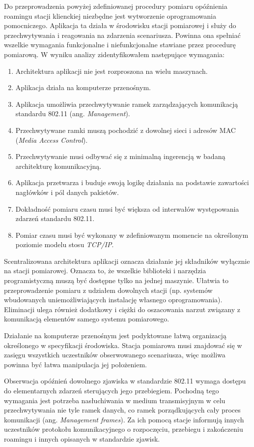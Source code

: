 Do przeprowadzenia powyżej zdefiniowanej procedury pomiaru opóźnienia roamingu stacji klienckiej niezbędne jest wytworzenie oprogramowania pomocniczego. Aplikacja ta działa w środowisku stacji pomiarowej i służy do przechwytywania i reagowania na zdarzenia scenariusza. Powinna ona spełniać wszelkie wymagania funkcjonalne i niefunkcjonalne stawiane przez procedurę pomiarową. W wyniku analizy zidentyfikowałem następujące wymagania: 
\begin{enumerate}
\item Architektura aplikacji nie jest rozproszona na wielu maszynach.
\item Aplikacja działa na komputerze przenośnym.
\item Aplikacja umożliwia przechwytywanie ramek zarządzających komunikacją standardu 802.11 (ang. \emph{Management}). 
\item Przechwytywane ramki muszą pochodzić z dowolnej sieci i adresów MAC (\emph{Media Access Control}).
\item Przechwytywanie musi odbywać się z minimalną ingerencją w badaną architekturę komunikacyjną.
\item Aplikacja przetwarza i buduje swoją logikę działania na podstawie zawartości nagłówków i pól danych pakietów. 
\item Dokładność pomiaru czasu musi być większa od interwałów występowania zdarzeń standardu 802.11.
\item Pomiar czasu musi być wykonany w zdefiniowanym momencie na określonym poziomie modelu stosu \emph{TCP/IP}.
\end{enumerate}

Scentralizowana architektura aplikacji oznacza działanie jej składników wyłącznie na stacji pomiarowej. Oznacza to, że wszelkie biblioteki i narzędzia programistyczną muszą być dostępne tylko na jednej maszynie. Ułatwia to przeprowadzenie pomiaru z udziałem dowolnych stacji (np. systemów wbudowanych uniemożliwiających instalację własnego oprogramowania). Eliminacji ulega również dodatkowy i ciężki do oszacowania narzut związany z komunikacją elementów samego systemu pomiarowego.

Działanie na komputerze przenośnym jest podyktowane łatwą organizacją określonego w specyfikacji środowiska. Stacja pomiarowa musi znajdować się w zasięgu wszystkich uczestników obserwowanego scenariusza, więc możliwa powinna być łatwa manipulacja jej położeniem.

Obserwacja opóźnień dowolnego zjawiska w standardzie 802.11 wymaga dostępu do elementarnych zdarzeń sterujących jego przebiegiem. Pochodną tego wymagania jest potrzeba nasłuchiwania w medium transmisyjnym w celu przechwytywania nie tyle ramek danych, co ramek porządkujących cały proces komunikacji (ang. \emph{Management frames}). Za ich pomocą stacje informują innych uczestników protokołu komunikacyjnego o rozpoczęciu, przebiegu i zakończeniu roamingu i innych opisanych w standardzie zjawisk. 

